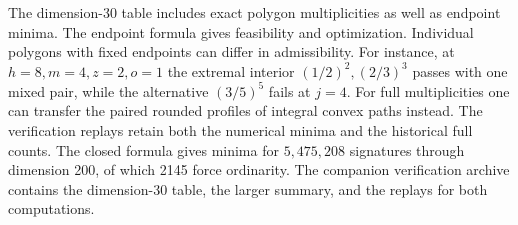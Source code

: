 The dimension-30 table includes exact polygon multiplicities
as well as endpoint minima. The endpoint formula gives feasibility
and optimization. Individual polygons with fixed endpoints can
differ in admissibility. For instance, at \(h=8,m=4,z=2,o=1\)
the extremal interior \((1/2)^2,(2/3)^3\) passes with one mixed
pair, while the alternative \((3/5)^5\) fails at \(j=4\).
For full multiplicities one can transfer the paired rounded
profiles of integral convex paths instead. The verification
replays retain both the numerical minima and the historical full
counts. The closed formula gives minima for \(5{,}475{,}208\)
signatures through dimension 200, of which 2145 force ordinarity.
The companion verification archive contains the dimension-30 table,
the larger summary, and the replays for both computations.
